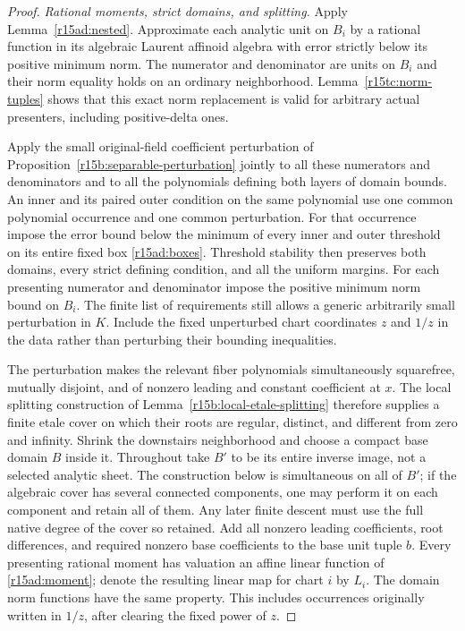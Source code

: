 \begin{proof}
\emph{Rational moments, strict domains, and splitting.}
Apply Lemma~\ref{r15ad:nested}.  Approximate each analytic
unit on $B_i$ by a rational function in its algebraic
Laurent affinoid algebra with error strictly below its
positive minimum norm.  The numerator and denominator
are units on $B_i$ and their norm equality holds on an
ordinary neighborhood.  Lemma~\ref{r15tc:norm-tuples}
shows that this exact norm replacement is valid for
arbitrary actual presenters, including positive-delta
ones.

Apply the small original-field coefficient perturbation
of Proposition~\ref{r15b:separable-perturbation} jointly
to all these numerators and denominators and to all the
polynomials defining both layers of domain bounds.
An inner and its paired outer condition on the same
polynomial use one common polynomial occurrence and
one common perturbation.  For that occurrence impose
the error bound below the minimum of every inner and
outer threshold on its entire fixed
box \eqref{r15ad:boxes}.  Threshold stability then
preserves both domains, every strict defining condition,
and all the uniform margins.  For each presenting
numerator and denominator impose the positive minimum
norm bound on $B_i$.  The finite list of requirements
still allows a generic arbitrarily small perturbation
in $K$.  Include the fixed unperturbed chart coordinates
$z$ and $1/z$ in the data rather than perturbing their
bounding inequalities.

The perturbation makes the relevant fiber polynomials
simultaneously squarefree, mutually disjoint, and of
nonzero leading and constant coefficient at $x$.
The local splitting construction of
Lemma~\ref{r15b:local-etale-splitting} therefore supplies a
finite etale cover on which their roots are regular,
distinct, and different from zero and infinity.
Shrink the downstairs neighborhood and choose a compact
base domain $B$ inside it.  Throughout take $B'$ to be
its entire inverse image, not a selected analytic sheet.
The construction below is simultaneous on all of $B'$;
if the algebraic cover has several connected components,
one may perform it on each component and retain all of
them.  Any later finite descent must use the full native
degree of the cover so retained.  Add all nonzero leading coefficients, root
differences, and required nonzero base coefficients
to the base unit tuple $b$.  Every presenting rational
moment has valuation an affine linear function of
\eqref{r15ad:moment}; denote the resulting linear map
for chart $i$ by $L_i$.  The domain norm functions
have the same property.  This includes occurrences
originally written in $1/z$, after clearing the fixed
power of $z$.


\end{proof}
